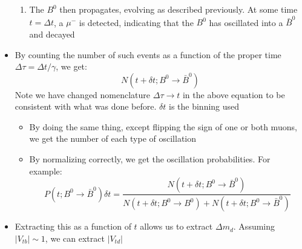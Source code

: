 \documentclass[11pt]{article}
\begin{document}
\begin{itemize}
\begin{enumerate}
    \item The $B^0$ then propagates, evolving as described previously. At some time $t=\Delta t$, a $\mu^-$ is detected, indicating that the $B^0$ has oscillated into a $\bar B^0$ and decayed
  \end{enumerate}
  \item By counting the number of such events as a function of the proper time $\Delta \tau = \Delta t/\gamma$, we get:
  \begin{equation}
    N (t+\delta t; B^0 \rightarrow \bar B^0)
  \end{equation}
  Note we have changed nomenclature $\Delta \tau \rightarrow t$ in the above equation to be consistent with what was done before. $\delta t$ is the binning used
  \begin{itemize}
    \item By doing the same thing, except flipping the sign of one or both muons, we get the number of each type of oscillation
    \item By normalizing correctly, we get the oscillation probabilities. For example:
    \begin{equation}
      P(t;  B^0 \rightarrow \bar B^0)\delta t = \frac{ N (t+\delta t; B^0 \rightarrow \bar B^0) }{ N (t+\delta t; B^0 \rightarrow B^0) + N (t+\delta t; B^0 \rightarrow \bar B^0) }
    \end{equation}
  \end{itemize}
  \item Extracting this as a function of $t$ allows us to extract $\Delta m_d$. Assuming $|V_{tb}|\sim 1$, we can extract $|V_{td}|$
\end{itemize}
\end{document}
